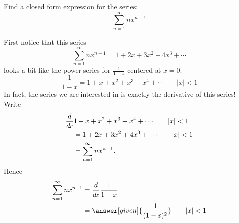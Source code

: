 \documentclass{ximera}
\begin{document}
\begin{example}
  Find a closed form expression for the series:
  \[
  \sum_{n=1}^\infty nx^{n-1}
  \]
  \begin{explanation}
    First notice that this series
    \[
    \sum_{n=1}^\infty nx^{n-1} = 1 + 2x + 3x^2 + 4x^3 + \cdots
    \]
    looks a bit like the power series for $\frac{1}{1-x}$  centered at $x=0$:
    \[
    \frac{1}{1-x} = 1+ x+x^2 + x^3+x^4+\cdots\qquad |x|<1
    \]
    In fact, the series we are interested in is exactly the derivative of this series! Write
    \begin{align*}
    \frac{d}{\mathop{}\!d\! x} &1+ x+x^2 + x^3+x^4+\cdots\qquad |x|<1\\
    &=1 + 2x + 3x^2 + 4x^3 + \cdots\qquad |x|<1\\
    &=\sum_{n=1}^\infty nx^{n-1}.
    \end{align*}
    Hence
    \begin{align*}
    \sum_{n=1}^\infty nx^{n-1} &= \ddx \frac{1}{1-x}\\
    &=\answer[given]{\frac{1}{(1-x)^2}}\qquad |x|<1
    \end{align*}
  \end{explanation}
\end{example}
\end{document}
